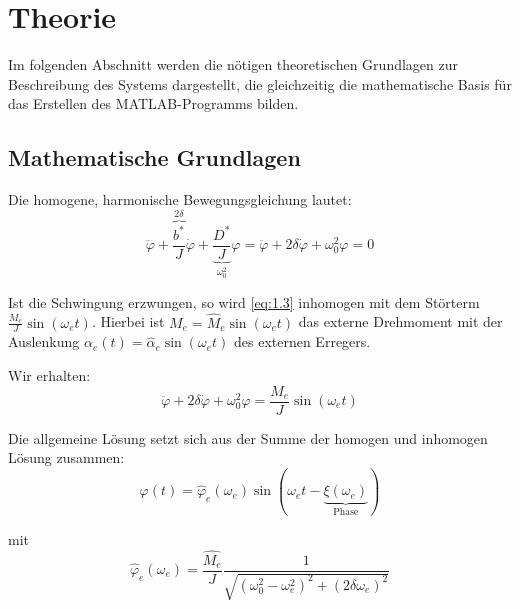\chapter{Theorie}
    Im folgenden Abschnitt werden die nötigen theoretischen Grundlagen zur Beschreibung des Systems dargestellt, die gleichzeitig die mathematische Basis für das Erstellen des \textsc{MATLAB}-Programms bilden.

    \section{Mathematische Grundlagen}

        Die homogene, harmonische Bewegungsgleichung lautet:
        \begin{equation}
            \ddot{\varphi} + \overbrace{\frac{b^\ast}{J}}^{2\delta}\dot{\varphi} + \underbrace{\frac{D^\ast}{J}}_{\omega_0^2}\varphi = \ddot{\varphi} + 2\delta\dot{\varphi} + \omega_0^2\varphi = 0
            \tag{1.3}\label{eq:1.3}
        \end{equation}

        Ist die Schwingung erzwungen, so wird \cref{eq:1.3} inhomogen mit dem Störterm \(\frac{M_e}{J}\sin(\omega_e t)\).
        Hierbei ist \(M_e = \hat{M}_e\sin(\omega_e t)\) das externe Drehmoment mit der Auslenkung \(\alpha_e(t) = \hat{\alpha}_e\sin(\omega_e t) \) des externen Erregers.

        Wir erhalten:
        \begin{equation}
            \ddot{\varphi} + 2\delta\dot{\varphi} + \omega_0^2\varphi = \frac{M_e}{J}\sin(\omega_e t)\label{eq:1.10}
        \end{equation}

        Die allgemeine Lösung setzt sich aus der Summe der homogen und inhomogen Lösung zusammen: 
        \begin{equation}
            \varphi(t) = \hat{\varphi}_e(\omega_e) \sin(\omega_e t - \underbrace{\xi(\omega_e)}_{\text{Phase}})\label{eq:1.11}
        \end{equation}

        mit
        \begin{equation}
            \hat{\varphi}_e(\omega_e) = \frac{\hat{M_e}}{J} \frac{1}{\sqrt{(\omega_0^2 - \omega_e^2)^2 + (2\delta \omega_e)^2}}\label{eq:1.11a}
        \end{equation}

